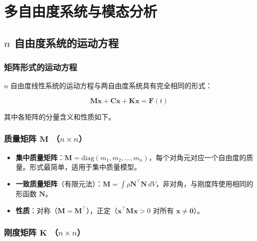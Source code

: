 \chapter{多自由度系统与模态分析}

\section{$n$ 自由度系统的运动方程}

\subsection{矩阵形式的运动方程}

$n$ 自由度线性系统的运动方程与两自由度系统具有完全相同的形式：

\begin{myformula}
\[
\mathbf{M}\ddot{\mathbf{x}} + \mathbf{C}\dot{\mathbf{x}} + \mathbf{K}\mathbf{x} = \mathbf{F}(t)
\]
\end{myformula}

其中各矩阵的分量含义和性质如下。

\subsection{质量矩阵 $\mathbf{M}$ （$n \times n$）}

\begin{itemize}
\item \textbf{集中质量矩阵}：$\mathbf{M} = \text{diag}(m_1, m_2, \ldots, m_n)$，每个对角元对应一个自由度的质量。形式最简单，适用于集中质量模型。
\item \textbf{一致质量矩阵}（有限元法）：$\mathbf{M} = \int \rho \mathbf{N}^{\top}\mathbf{N}\,dV$，非对角，与刚度阵使用相同的形函数 $\mathbf{N}$。
\item \textbf{性质}：对称（$\mathbf{M} = \mathbf{M}^{\top}$），正定（$\mathbf{x}^{\top}\mathbf{M}\mathbf{x} > 0$ 对所有 $\mathbf{x} \neq \mathbf{0}$）。
\end{itemize}

\subsection{刚度矩阵 $\mathbf{K}$ （$n \times n$）}

